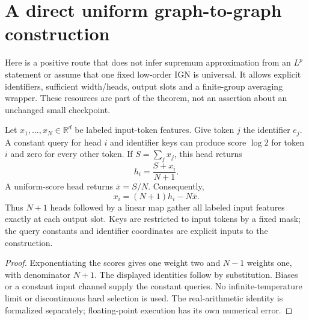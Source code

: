 \section{A direct uniform graph-to-graph construction}

Here is a positive route that does not infer supremum approximation from an $L^p$ statement or assume that one fixed low-order IGN is universal. It allows explicit identifiers, sufficient width/heads, output slots and a finite-group averaging wrapper. These resources are part of the theorem, not an assertion about an unchanged small checkpoint.

\begin{lemma}
Let $x_1,\ldots,x_N\in\mathbb R^d$ be labeled input-token features. Give token $j$ the identifier $e_j$. A constant query for head $i$ and identifier keys can produce score $\log2$ for token $i$ and zero for every other token. If $S=\sum_jx_j$, this head returns
\[
 h_i=\frac{S+x_i}{N+1}.
\]
A uniform-score head returns $\bar x=S/N$. Consequently,
\[
 x_i=(N+1)h_i-N\bar x.
\]
Thus $N+1$ heads followed by a linear map gather all labeled input features exactly at each output slot. Keys are restricted to input tokens by a fixed mask; the query constants and identifier coordinates are explicit inputs to the construction.
\end{lemma}
\begin{proof}
Exponentiating the scores gives one weight two and $N-1$ weights one, with denominator $N+1$. The displayed identities follow by substitution. Biases or a constant input channel supply the constant queries. No infinite-temperature limit or discontinuous hard selection is used. The real-arithmetic identity is formalized separately; floating-point execution has its own numerical error.
\end{proof}

